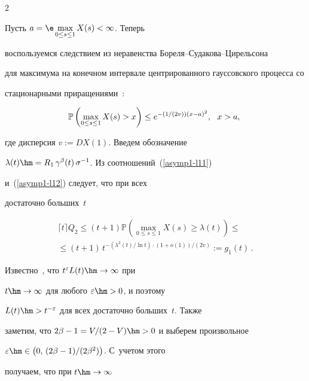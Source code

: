 \begin{multicols}{2}
\begin{equation}
\label{asymp1-l11}


\end{equation}


Пусть $a=\e \max\limits_{0 \leq s \leq 1}X(s)<\infty$. Теперь


воспользуемся следствием из неравенства  Бо\-ре\-ля--Су\-да\-ко\-ва--Ци\-рель\-со\-на


для максимума на конечном интервале  центрированного гауссовского процесса со


стационарными приращениями~\cite{Adler}:


\begin{equation}


\hspace*{-1.5mm}\mathbb{P} \left( \max\limits_{0 \leq s \leq 1} X(s)> x \right) \leq


e^{-(1/(2v))(x-a)^2}, \ \ x>a,\!


\label{asymp1-l12}


\end{equation}


где дисперсия $v:=D X(1)$. Введем обозначение


$\lambda(t)\hm=R_1\,\gamma^\beta(t)\,\sigma^{-1}$. Из соотношений~(\ref{asymp1-l11})


и~(\ref{asymp1-l12}) следует, что при всех


достаточно больших~$t$


\begin{multline*}


\lceil t \rceil Q_2 \le  (t+1)\mathbb{P} \left( \max_{0 \leq s \leq 1}


X(s) \geq \lambda(t) \right)\leq{}\\


{}\leq (t+1)\,t^{-({\lambda^2(t)}/{\ln


t})\cdot (1+o(1))/(2v)} :=g_1(t)\,.


\end{multline*}


Известно~\cite{Seneta}, что   $t^\varepsilon L(t)\hm\to \infty $ при


$t\hm\to \infty$ для любого $\varepsilon\hm>0$, и поэтому


$L(t)\hm>t^{-\varepsilon}$ для всех  достаточно больших~$t$. Также


заметим, что $2\beta-1={V}/(2-V)\hm>0$ и выберем произвольное


$\varepsilon\hm\in \left(0,\,(2\beta-1)/(2\beta^2)\right)$. С~учетом этого


получаем, что при $t\hm\to \infty$



\end{multicols}
